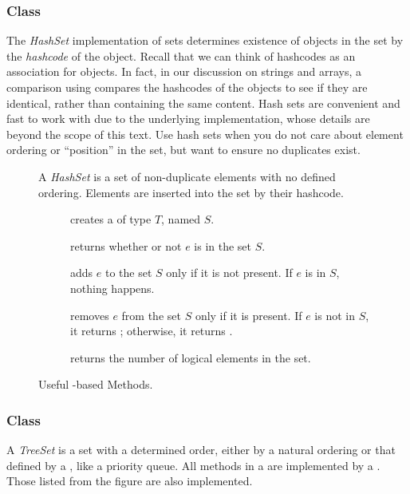 \subsubsection*{ Class}
The \textit{HashSet} implementation of sets determines existence of objects in the set by the \textit{hashcode} of the object. Recall that we can think of hashcodes as an association for objects. In fact, in our discussion on strings and arrays, a comparison using \ttt{==} compares the hashcodes of the objects to see if they are identical, rather than containing the same content.
 Hash sets are convenient and fast to work with due to the underlying implementation, whose details are beyond the scope of this text. Use hash sets when you do not care about element ordering or ``position'' in the set, but want to ensure no duplicates exist.
\begin{figure}[tp]
  \small
  \begin{tcolorbox}[title=Java Hash Sets]
    A \textit{HashSet} is a set of non-duplicate elements with no defined ordering. Elements are inserted into the set by their hashcode.
    \vspace{2ex}
  \begin{description}
    \item [] creates a  of type $T$, named $S$.
     \item [] returns whether or not $e$ is in the set $S$.
     \item [] adds $e$ to the set $S$ only if it is not present. If $e$ is in $S$, nothing happens.
     \item [] removes $e$ from the set $S$ only if it is present. If $e$ is not in $S$, it returns ; otherwise, it returns .
    \item [] returns the number of logical elements in the set.
  \end{description}
\end{tcolorbox}
  \caption{Useful -based Methods.}
  \label{fig:hashsets}
\end{figure}

\subsubsection*{ Class}
A \textit{TreeSet} is a set with a determined order, either by a natural ordering or that defined by a , like a priority queue. All methods in a  are implemented by a . Those listed from the  figure are also implemented.


